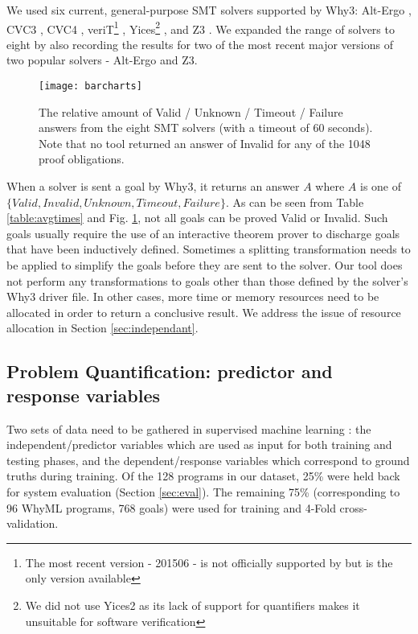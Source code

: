 We used six current, general-purpose SMT solvers supported by \textsf{Why3}: Alt-Ergo \cite{AltErgo}, CVC3 \cite{CVC3}, CVC4 \cite{CVC4}, veriT\footnote{The most recent version - 201506 - is not officially supported by \why but is the only version available} \cite{veriT}, Yices\footnote{We did not use Yices2 as its lack of support for quantifiers makes it unsuitable for software verification} \cite{Yices}, and Z3 \cite{Z3}. We expanded the range of solvers to eight by also recording the results for two of the most recent major versions of two popular solvers - Alt-Ergo and Z3.


\begin{figure}
	\centering
	\texttt{[image: barcharts]}
	\caption{The relative amount of Valid / Unknown / Timeout / Failure answers from the eight SMT solvers (with a timeout of 60 seconds). Note that no tool returned an answer of Invalid for any of the 1048 proof obligations.}
	\label{fig:barcharts}
\end{figure}

When a solver is sent a goal by \textsf{Why3}, it returns an answer $A$ where $A$ is one of $\lbrace Valid,Invalid,Unknown,Timeout,Failure \rbrace$. As can be seen from Table \ref{table:avgtimes} and Fig. \ref{fig:barcharts}, not all goals can be proved Valid or Invalid. Such goals usually require the use of an interactive theorem prover to discharge goals that have been inductively defined. Sometimes a splitting transformation needs to be applied to simplify the goals before they are sent to the solver. Our tool does not perform any transformations to goals other than those defined by the solver's \textsf{Why3} driver file. In other cases, more time or memory resources need to be allocated in order to return a conclusive result. We address the issue of resource allocation in Section \ref{sec:independant}.     

\subsection{Problem Quantification: predictor and response variables}

Two sets of data need to be gathered in supervised machine learning \cite{Mitchell}: the independent/predictor variables which are used as input for both training and testing phases, and the dependent/response variables which correspond to ground truths during training. Of the 128 programs in our dataset, 25\% were held back for system evaluation (Section \ref{sec:eval}). The remaining 75\% (corresponding to 96 WhyML programs, 768 goals) were used for training and 4-Fold cross-validation.

